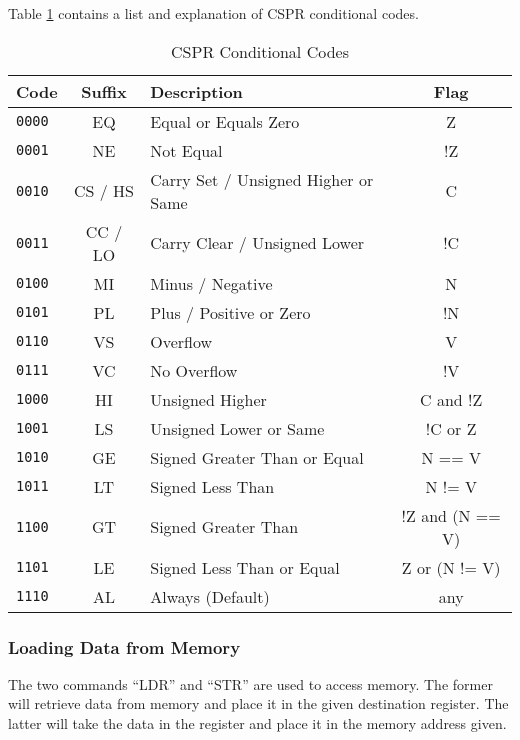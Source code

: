 				Table \ref{tab:CSPRConditionCodes} contains a list and explanation of CSPR conditional codes.
				\begin{table}[htb]
					\centering
					\begin{adjustbox}{max width=1\textwidth}
					\begin{tabular}{lclc}
						\toprule
						\textbf{Code} & \textbf{Suffix} & \textbf{Description} & \textbf{Flag} \\
						\toprule
						\texttt{0000} & EQ & Equal or Equals Zero & Z \\
						\texttt{0001} & NE & Not Equal & !Z \\
						\texttt{0010} & CS / HS & Carry Set / Unsigned Higher or Same & C \\
						\texttt{0011} & CC / LO & Carry Clear / Unsigned Lower & !C \\
						\texttt{0100} & MI & Minus / Negative & N \\
						\texttt{0101} & PL & Plus / Positive or Zero & !N \\
						\texttt{0110} & VS & Overflow & V \\
						\texttt{0111} & VC & No Overflow & !V \\
						\texttt{1000} & HI & Unsigned Higher & C and !Z  \\
						\texttt{1001} & LS & Unsigned Lower or Same & !C or Z \\
						\texttt{1010} & GE & Signed Greater Than or Equal & N == V \\
						\texttt{1011} & LT & Signed Less Than & N != V \\
						\texttt{1100} & GT & Signed Greater Than & !Z and (N == V) \\
						\texttt{1101} & LE & Signed Less Than or Equal & Z or (N != V) \\
						\texttt{1110} & AL & Always (Default) & any \\
						\bottomrule
					\end{tabular}
					\end{adjustbox}
					\caption{CSPR Conditional Codes}
					\label{tab:CSPRConditionCodes}
				\end{table}


			\subsubsection{Loading Data from Memory}
				The two commands ``LDR'' and ``STR'' are used to access memory.
				The former will retrieve data from memory and place it in the given destination register.
				The latter will take the data in the register and place it in the memory address given.

